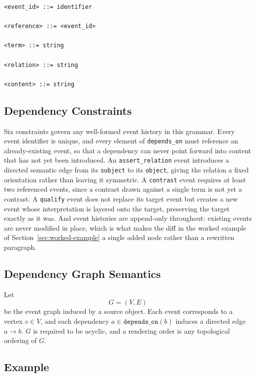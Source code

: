 \documentclass[11pt]{article}
\theoremstyle{definition}
\begin{document}
\begin{verbatim}
<event_id> ::= identifier

<reference> ::= <event_id>

<term> ::= string

<relation> ::= string

<content> ::= string
\end{verbatim}

\subsection{Dependency Constraints}

Six constraints govern any well-formed event history in this grammar. Every event identifier is unique, and every element of \texttt{depends\_on} must reference an already-existing event, so that a dependency can never point forward into content that has not yet been introduced. An \texttt{assert\_relation} event introduces a directed semantic edge from its \texttt{subject} to its \texttt{object}, giving the relation a fixed orientation rather than leaving it symmetric. A \texttt{contrast} event requires at least two referenced events, since a contrast drawn against a single term is not yet a contrast. A \texttt{qualify} event does not replace its target event but creates a new event whose interpretation is layered onto the target, preserving the target exactly as it was. And event histories are append-only throughout: existing events are never modified in place, which is what makes the diff in the worked example of Section~\ref{sec:worked-example} a single added node rather than a rewritten paragraph.

\subsection{Dependency Graph Semantics}

Let
\[
G = (V,E)
\]
be the event graph induced by a source object. Each event corresponds to a vertex $v \in V$, and each dependency $a \in \texttt{depends\_on}(b)$ induces a directed edge $a \rightarrow b$. $G$ is required to be acyclic, and a rendering order is any topological ordering of $G$.

\subsection{Example}
\end{document}
